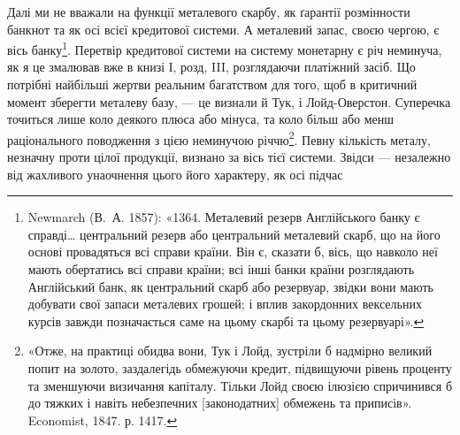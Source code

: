 Далі ми не вважали на функції металевого скарбу, як ґарантії розмінности
банкнот та як осі всієї кредитової системи. А металевий запас, своєю чергою,
є вісь банку\footnote{
Newmarch (В.~А. 1857): «1364. Металевий резерв Англійського банку є справді\dots{} центральний
резерв або центральний металевий скарб, що на його основі провадяться всі справи країни.
Він є, сказати б, вісь, що навколо неї мають обертатись всі справи країни; всі інші банки країни
розглядають Англійський банк, як центральний скарб або резервуар, звідки вони мають добувати свої
запаси металевих грошей; і вплив закордонних вексельних курсів завжди позначається саме на цьому
скарбі та цьому резервуарі».
}. Перетвір кредитової системи на систему монетарну є річ неминуча,
як я це змалював вже в книзі І, розд, III, розглядаючи платіжний
засіб. Що потрібні найбільші жертви реальним багатством для того, щоб в критичний
момент зберегти металеву базу, — це визнали й Тук, і Лойд-Оверстон.
Суперечка точиться лише коло деякого плюса або мінуса, та коло більш або
менш раціонального поводження з цією неминучою річчю\footnote{
«Отже, на практиці обидва вони, Тук і Лойд, зустріли б надмірно великий попит на золото,
заздалегідь обмежуючи кредит, підвищуючи рівень проценту та зменшуючи визичання капіталу. Тільки
Лойд своєю ілюзією спричинився б до тяжких і навіть небезпечних [законодатних] обмежень та
приписів».
Economist, 1847. р. 1417.
}. Певну кількість
металу, незначну проти цілої продукції, визнано за вісь тієї системи. Звідси —
незалежно від жахливого унаочнення цього його характеру, як осі підчас
\parbreak{}  %
